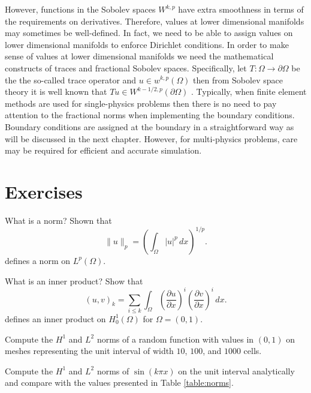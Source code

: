However, functions in the Sobolev spaces $W^{k,p}$ have extra smoothness in terms of the requirements on derivatives. 
Therefore,
values at lower dimensional manifolds may sometimes be well-defined. In fact, we need to 
be able to assign values on lower dimensional manifolds to enforce Dirichlet conditions. 
In order to make sense of values at lower 
dimensional manifolds we need the mathematical constructs of traces and fractional 
Sobolev spaces. Specifically, let $T:\Omega \rightarrow \partial \Omega$ be the 
the so-called trace operator and $u \in w^{k,p}(\Omega)$ then from Sobolev space theory
it is well known that $Tu \in W^{k-1/2, p} (\partial \Omega)$ \cite{evans2022partial}. 
Typically, when finite element methods
are used for single-physics problems then there is no need to pay attention to 
the fractional norms when implementing the boundary conditions. Boundary conditions
are assigned at the boundary in a straightforward way as will be discussed in the next
chapter. However, for multi-physics problems, care may be required for efficient and
accurate simulation.   







\section{Exercises}

\begin{exercise}
What is a norm? Shown that 
\[
\|u\|_p = (\int_\Omega |u|^p \, dx)^{1/p} .    
\]
defines a norm on $L^p(\Omega)$. 

\end{exercise}

\begin{exercise}
What is an inner product? 
Show that 
\[
	(u, v)_{k} = \sum_{i \le k} \int_\Omega (\frac{\partial u}{\partial x})^i (\frac{\partial v}{\partial x})^i \,  dx.    
\]
defines an inner product on $H^1_0 (\Omega)$ for $\Omega=(0,1)$.   

\end{exercise}

\begin{exercise}
Compute the $H^1$ and $L^2$ norms of a random function with values
in $(0,1)$ on meshes representing the unit interval of width $10$, $100$, and $1000$ cells.   
\end{exercise}

\begin{exercise}
Compute the $H^1$ and $L^2$ norms of  $\sin( k \pi x)$ on the unit interval analytically 
and compare with the values presented in Table \ref{table:norms}.   
\end{exercise}

